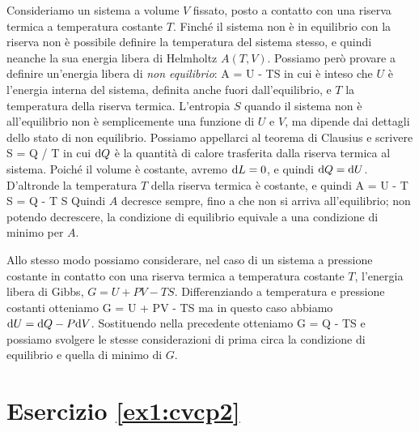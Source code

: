 Consideriamo un sistema a volume $V$ fissato, posto a contatto con una riserva termica a temperatura costante $T$. Finché il sistema non è in equilibrio con la riserva non è possibile definire la temperatura del sistema stesso, e quindi neanche la sua energia libera di Helmholtz $A(T,V)$. Possiamo però provare a definire un'energia libera di {\em non equilibrio}:
\be
A = U - TS
\ee
in cui è inteso che $U$ è l'energia interna del sistema, definita anche fuori dall'equilibrio, e $T$ la temperatura della riserva termica. L'entropia $S$ quando il sistema non è all'equilibrio non è semplicemente una funzione di $U$ e $V$, ma dipende dai dettagli dello stato di non equilibrio. Possiamo appellarci al teorema di Clausius e scrivere
\be
\de S = \ge \de Q / T
\ee
in cui ${\textrm d}Q$ è la quantità di calore trasferita dalla riserva termica al sistema. Poiché il volume è costante, avremo ${\textrm d}L = 0$, e quindi ${\textrm d}Q = {\textrm d}U$. D'altronde la temperatura $T$ della riserva termica è costante, e quindi
\be
\de A = \de U - T \de S = \de Q - T \de S 
\ee
Quindi $A$ decresce sempre, fino a che non si arriva all'equilibrio; non potendo decrescere, la condizione di equilibrio equivale a una condizione di minimo per $A$.

Allo stesso modo possiamo considerare, nel caso di un sistema a pressione costante in contatto con una riserva termica a temperatura costante $T$, l'energia libera di Gibbs, $G = U + PV - TS$. Differenziando a temperatura e pressione costanti otteniamo
\be
\de G = \de U + P\de V - T\de S
\ee
ma in questo caso abbiamo ${\textrm d}U = {\textrm d}Q - P{\textrm d}V$. Sostituendo nella precedente otteniamo
\be
\de G = \de Q - T\de S 
\ee
e possiamo svolgere le stesse considerazioni di prima circa la condizione di equilibrio e quella di minimo di $G$.

%
%
\section*{Esercizio \ref{ex1:cvcp2}}

